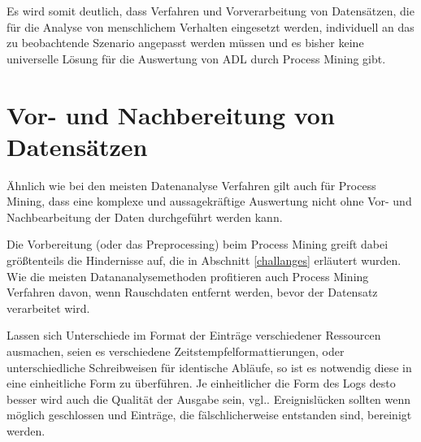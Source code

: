 Es wird somit deutlich, dass Verfahren und Vorverarbeitung von Datensätzen, die für die Analyse von menschlichem Verhalten eingesetzt werden, individuell an das zu beobachtende Szenario angepasst werden müssen und es bisher keine universelle Lösung für die Auswertung von ADL durch Process Mining gibt.


\section{Vor- und Nachbereitung von Datensätzen}
Ähnlich wie bei den meisten Datenanalyse Verfahren gilt auch für Process Mining, dass eine komplexe und aussagekräftige Auswertung nicht ohne Vor- und Nachbearbeitung der Daten durchgeführt werden kann.

Die Vorbereitung (oder das Preprocessing) beim Process Mining greift dabei größtenteils die Hindernisse auf, die in Abschnitt \ref{challanges} erläutert wurden. Wie die meisten Datananalysemethoden profitieren auch Process Mining Verfahren davon, wenn Rauschdaten entfernt werden, bevor der Datensatz verarbeitet wird. 

Lassen sich Unterschiede im Format der Einträge verschiedener Ressourcen ausmachen, seien es verschiedene Zeitstempfelformattierungen, oder unterschiedliche Schreibweisen für identische Abläufe, so ist es notwendig diese in eine einheitliche Form zu überführen. Je einheitlicher die Form des Logs desto besser wird auch die Qualität der Ausgabe sein, vgl.\cite{PMinAction}. Ereignislücken sollten wenn möglich geschlossen und Einträge, die fälschlicherweise entstanden sind, bereinigt werden.

